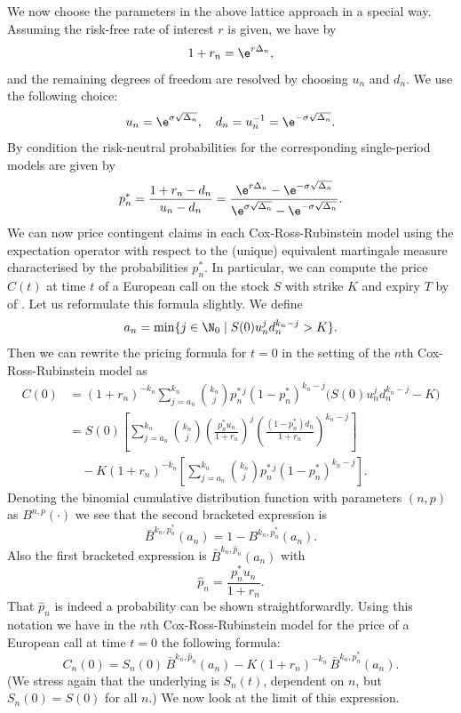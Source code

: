 We now choose the parameters in the above lattice approach in a special way. Assuming the risk-free rate of interest \(r\) is given, we have by 
\[
	1 + r_n = \e^{r\Delta_n},
\]
and the remaining degrees of freedom are resolved by choosing \(u_n\) and \(d_n\). We use the following choice:
\[
	u_n = \e^{\sigma\sqrt{\Delta_n}}, \quad d_n = u_n^{-1} = \e^{-\sigma\sqrt{\Delta_n}}.
\]
By condition  the risk-neutral probabilities for the corresponding single-period models are given by
\[
	p_n^* = \frac{1 + r_n - d_n}{u_n - d_n}
	= \frac{\e^{r\Delta_n} - \e^{-\sigma\sqrt{\Delta_n}}}{\e^{\sigma\sqrt{\Delta_n}} - \e^{-\sigma\sqrt{\Delta_n}}}.
\]
We can now price contingent claims in each Cox-Ross-Rubinstein model using the expectation operator with respect to the (unique) equivalent martingale measure characterised by the probabilities \(p_n^*\). In particular, we can compute the price \(C(t)\) at time \(t\) of a European call on the stock \(S\) with strike \(K\) and expiry \(T\) by  of . Let us reformulate this formula slightly. We define
\begin{equation}\label{eq:MinSteps}
	a_n = \min\{ j \in \N_0 \mid S(0)u_n^j d_n^{k_n-j} > K \}.
\end{equation}
Then we can rewrite the pricing formula  for \(t=0\) in the setting of the \(n\)th Cox-Ross-Rubinstein model as
\begin{align*}
	C(0) & = (1+r_n)^{-k_n} \sum_{j=a_n}^{k_n} \binom{k_n}{j} p_n^{*\,j} (1-p_n^*)^{k_n-j} \bigl(S(0)u_n^j d_n^{k_n-j} - K\bigr)                     \\
	     & = S(0)\left[\sum_{j=a_n}^{k_n} \binom{k_n}{j}\left(\frac{p_n^* u_n}{1+r_n}\right)^j\left(\frac{(1-p_n^*)d_n}{1+r_n}\right)^{k_n-j}\right] \\
	     & \quad - K(1+r_n)^{-k_n}\left[\sum_{j=a_n}^{k_n} \binom{k_n}{j} p_n^{*\,j} (1-p_n^*)^{k_n-j}\right].
\end{align*}
Denoting the binomial cumulative distribution function with parameters \((n,p)\) as \(B^{n,p}(\cdot)\) we see that the second bracketed expression is
\[
	\bar{B}^{k_n,p_n^*}(a_n) = 1 - B^{k_n,p_n^*}(a_n).
\]
Also the first bracketed expression is \(\bar{B}^{k_n,\hat{p}_n}(a_n)\) with
\[
	\hat{p}_n = \frac{p_n^* u_n}{1+r_n}.
\]
That \(\hat{p}_n\) is indeed a probability can be shown straightforwardly. Using this notation we have in the \(n\)th Cox-Ross-Rubinstein model for the price of a European call at time \(t=0\) the following formula:
\begin{equation}\label{eq:CRRPricing}
	C_n(0) = S_n(0)\,\bar{B}^{k_n,\hat{p}_n}(a_n) - K(1+r_n)^{-k_n}\,\bar{B}^{k_n,p_n^*}(a_n).
\end{equation}
(We stress again that the underlying is \(S_n(t)\), dependent on \(n\), but \(S_n(0)=S(0)\) for all \(n\).) We now look at the limit of this expression.

